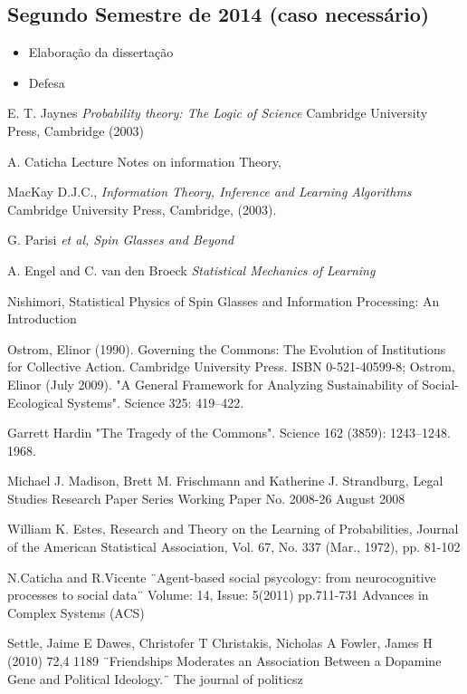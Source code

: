 \documentclass[11pt]{article}
\begin{document}
\subsection{Segundo Semestre de 2014 (caso necessário)}
\begin{itemize}
\item Elaboração da dissertação
\item Defesa
\end{itemize}

\begin{thebibliography}{99}

E. T. Jaynes {\it Probability theory: The Logic of
    Science} Cambridge University Press, Cambridge (2003)

 A. Caticha Lecture Notes on information Theory,

 MacKay D.J.C., \textit{Information Theory, Inference
    and Learning Algorithms}
Cambridge University Press, Cambridge, (2003).

 G. Parisi {\it et al, Spin Glasses and Beyond}

 A. Engel and C. van den Broeck {\it Statistical
    Mechanics of Learning}

 Nishimori, Statistical Physics of Spin Glasses and Information Processing: An Introduction

Ostrom, Elinor (1990). Governing the Commons: The Evolution of Institutions for Collective Action. Cambridge University Press. ISBN 0-521-40599-8; Ostrom, Elinor (July 2009). "A General Framework for Analyzing Sustainability of Social-Ecological Systems". Science 325: 419–422.

Garrett Hardin
"The Tragedy of the Commons". Science 162 (3859): 1243–1248. 1968.

Michael J. Madison, Brett M. Frischmann
and Katherine J. Strandburg, 
Legal Studies Research Paper Series
Working Paper No. 2008-26
August 2008

William K. Estes, Research and Theory on the
Learning of Probabilities,
Journal of the American Statistical Association, Vol. 67, No. 337
(Mar., 1972), pp. 81-102

N.Caticha and R.Vicente ¨Agent-based social psycology: from neurocognitive processes to social data¨ Volume: 14, Issue: 5(2011) pp.711-731 Advances in Complex Systems (ACS)

Settle, Jaime E Dawes, Christofer T Christakis, Nicholas A Fowler, James H (2010) 72,4 1189 ¨Friendships Moderates an Association Between a Dopamine Gene and Political Ideology.¨ The journal of politicsz


\end{thebibliography}
\end{document}

